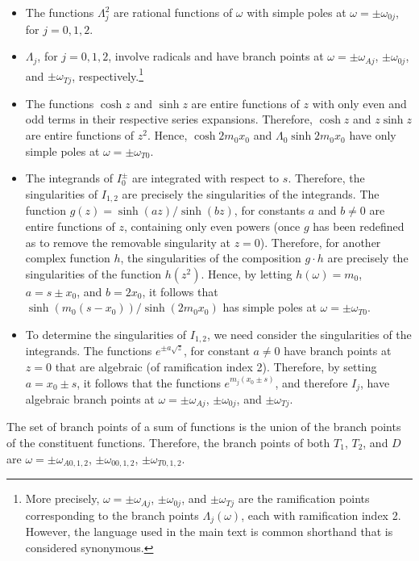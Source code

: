 \begin{itemize}
	\item The functions $\Lambda_j^2$ are rational functions of $\omega$ with simple poles at $\omega = \pm \omega_{0j}$, for $j = 0, 1, 2$.
	
	\item $\Lambda_j$, for $j = 0, 1, 2$, involve radicals and have branch points at $\omega = \pm \omega_{Aj}$, $\pm \omega_{0j}$, and $\pm \omega_{Tj}$, respectively.\footnote{More precisely, $\omega = \pm \omega_{Aj}$, $\pm \omega_{0j}$, and $\pm \omega_{Tj}$ are the ramification points corresponding to the branch points $\Lambda_j(\omega)$, each with ramification index 2. However, the language used in the main text is common shorthand that is considered synonymous.}
	
	\item The functions $\cosh{z}$ and $\sinh{z}$ are entire functions of $z$ with only even and odd terms in their respective series expansions. Therefore, $\cosh{z}$ and $z\sinh{z}$ are entire functions of $z^2$. Hence, $\cosh{2m_0x_0}$ and $\Lambda_0\sinh{2m_0x_0}$ have only simple poles at $\omega = \pm\omega_{T0}$.
	
	\item The integrands of $I_0^\pm$ are integrated with respect to $s$. Therefore, the singularities of $I_{1,2}$ are precisely the singularities of the integrands. The function $g(z) = \sinh(az) / \sinh(bz)$, for constants $a$ and $b \neq 0$ are entire functions of $z$, containing only even powers (once $g$ has been redefined as to remove the removable singularity at $z = 0$). Therefore, for another complex function $h$, the singularities of the composition $g \cdot h$ are precisely the singularities of the function $h(z^2)$. Hence, by letting $h(\omega) = m_0$, $a = s \pm x_0$, and $b = 2x_0$, it follows that $\sinh(m_0(s - x_0)) / \sinh(2m_0x_0)$ has simple poles at $\omega = \pm \omega_{T0}$.
	
	\item To determine the singularities of $I_{1,2}$, we need consider the singularities of the integrands. The functions $e^{\pm a\sqrt{z}}$, for constant $a \neq 0$ have branch points at $z = 0$ that are algebraic (of ramification index 2). Therefore, by setting $a = x_0 \pm s$, it follows that the functions $e^{m_j(x_0 \pm s)}$, and therefore $I_j$, have algebraic branch points at $\omega = \pm \omega_{Aj}$, $\pm \omega_{0j}$, and $\pm \omega_{Tj}$.
\end{itemize}
The set of branch points of a sum of functions is the union of the branch points of the constituent functions. Therefore, the branch points of both $T_1$, $T_2$, and $D$ are $\omega = \pm \omega_{A0,1,2}$, $\pm \omega_{00,1,2}$, $\pm \omega_{T0,1,2}$.


